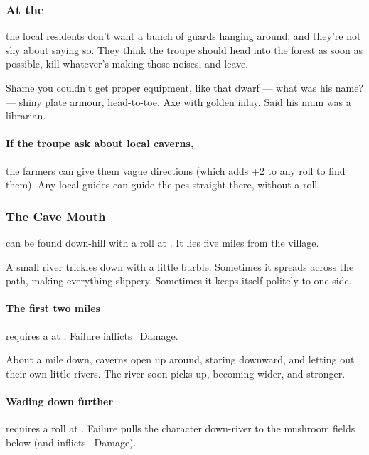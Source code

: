 \documentclass[10pt,twoside]{book}
\begin{document}
\subsubsection{At the }
the local residents don't want a bunch of \glspl{guard} hanging around, and they're not shy about saying so.
They think the troupe should head into the forest as soon as possible, kill whatever's making those noises, and leave.

\begin{speechtext}
  Shame you couldn't get proper equipment, like that dwarf --- what was his name? --- shiny plate armour, head-to-toe.
  Axe with golden inlay.
  Said his mum was a librarian.
\end{speechtext}

\paragraph{If the troupe ask about local caverns,}
the farmers can give them vague directions (which adds +2 to any roll to find them).
Any local guides can guide the \glspl{pc} straight there, without a roll.

\subsubsection{The Cave Mouth}
can be found down-hill with a  roll at \tn[12].
It lies five miles from the \gls{village}.

\begin{boxtext}
  A small river trickles down with a little burble.
  Sometimes it spreads across the path, making everything slippery.
  Sometimes it keeps itself politely to one side.
\end{boxtext}

\paragraph{The first two miles}
requires a  at \tn[8].
Failure inflicts ~Damage.

\begin{boxtext}
  About a mile down, caverns open up around, staring downward, and letting out their own little rivers.
  The river soon picks up, becoming wider, and stronger.
\end{boxtext}

\paragraph{Wading down further}
requires a  roll at \tn[8].
Failure pulls the character down-river to the mushroom fields below (and inflicts ~Damage).
\end{document}
